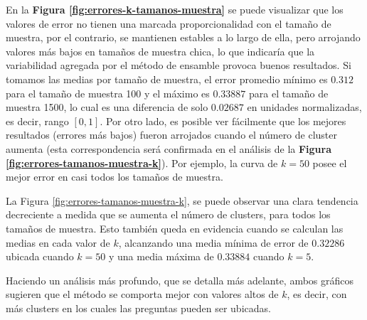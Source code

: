 \bigskip En la \textbf{Figura \ref{fig:errores-k-tamanos-muestra}} se puede visualizar que los valores de error no tienen una marcada proporcionalidad con el tamaño de muestra, por el contrario, se mantienen estables a lo largo de ella, pero arrojando valores más bajos en tamaños de muestra chica, lo que indicaría que la variabilidad agregada por el método de ensamble provoca buenos resultados. Si tomamos las medias por tamaño de muestra, el error promedio mínimo es \(0.312\) para el tamaño de muestra 100 y el máximo es \(0.33887\) para el tamaño de muestra 1500, lo cual es una diferencia de solo \(0.02687\) en unidades normalizadas, es decir, rango \([0, 1]\). Por otro lado, es posible ver fácilmente que los mejores resultados (errores más bajos) fueron arrojados cuando el número de cluster aumenta (esta correspondencia será confirmada en el análisis de la \textbf{Figura \ref{fig:errores-tamanos-muestra-k}}). Por ejemplo, la curva de \(k = 50\) posee el mejor error en casi todos los tamaños de muestra.

\bigskip La Figura \ref{fig:errores-tamanos-muestra-k}, se puede observar una clara tendencia decreciente a medida que se aumenta el número de clusters, para todos los tamaños de muestra. Esto también queda en evidencia cuando se calculan las medias en cada valor de \(k\), alcanzando una media mínima de error de \(0.32286\) ubicada cuando \(k = 50\) y una media máxima de \(0.33884\) cuando \(k = 5\).

\bigskip Haciendo un análisis más profundo, que se detalla más adelante, ambos gráficos sugieren que el método se comporta mejor con valores altos de \(k\), es decir, con más clusters en los cuales las preguntas pueden ser ubicadas.